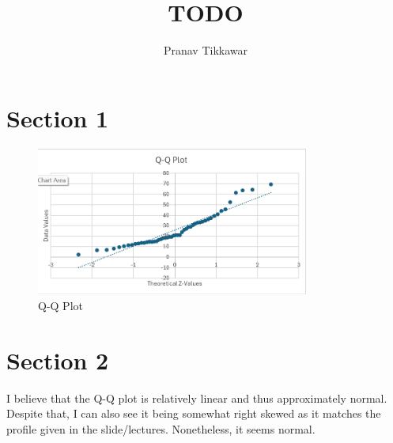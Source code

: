 \documentclass{article}
\author{Pranav Tikkawar}
\title{TODO}
\begin{document}
\maketitle

\section{Section 1}
\begin{figure}[ht]
    \centering
    \includegraphics[width=0.8\textwidth]{A3img/Q-QPlot.png}
    \caption{Q-Q Plot}
    \label{fig:qq_plot}
\end{figure}

\section{Section 2}
I believe that the Q-Q plot is relatively linear and thus approximately normal. Despite that, I can also see it being somewhat right skewed as it matches the profile given in the slide/lectures. Nonetheless, it seems normal. 
\end{document}
